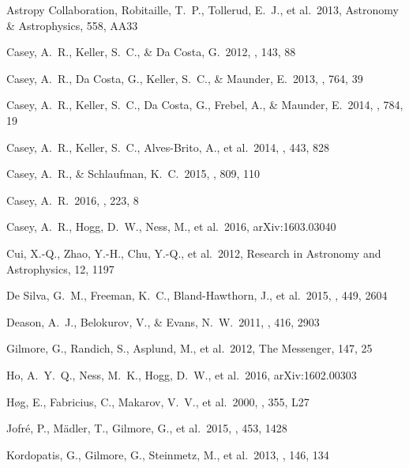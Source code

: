 \documentclass[preprint,trackchanges]{aastex}
\begin{document}
\begin{thebibliography}{dummy}
 Astropy Collaboration, Robitaille, T.~P., Tollerud, E.~J., et al.\ 2013, Astronomy \& Astrophysics, 558, AA33

 Casey, A.~R., Keller, S.~C., \& Da Costa, G.\ 2012, \aj, 143, 88 

 Casey, A.~R., Da Costa, G., Keller, S.~C., \& Maunder, E.\ 2013, \apj, 764, 39 

 Casey, A.~R., Keller, S.~C., Da Costa, G., Frebel, A., \& Maunder, E.\ 2014, \apj, 784, 19 

 Casey, A.~R., Keller, S.~C., Alves-Brito, A., et al.\ 2014, \mnras, 443, 828 

 Casey, A.~R., \& Schlaufman, K.~C.\ 2015, \apj, 809, 110 

 Casey, A.~R.\ 2016, \apjs, 223, 8 

 Casey, A.~R., Hogg, D.~W., Ness, M., et al.\ 2016, arXiv:1603.03040 

 Cui, X.-Q., Zhao, Y.-H., Chu, Y.-Q., et al.\ 2012, Research in Astronomy and Astrophysics, 12, 1197 

 De Silva, G.~M., Freeman, K.~C., Bland-Hawthorn, J., et al.\ 2015, \mnras, 449, 2604 

 Deason, A.~J., Belokurov, V., \& Evans, N.~W.\ 2011, \mnras, 416, 2903 

 Gilmore, G., Randich, S., Asplund, M., et al.\ 2012, The Messenger, 147, 25

 Ho, A.~Y.~Q., Ness, M.~K., Hogg, D.~W., et al.\ 2016, arXiv:1602.00303 
 
 H{\o}g, E., Fabricius, C., Makarov, V.~V., et al.\ 2000, \aap, 355, L27 

 Jofr{\'e}, P., M{\"a}dler, T., Gilmore, G., et al.\ 2015, \mnras, 453, 1428 

 Kordopatis, G., Gilmore, G., Steinmetz, M., et al.\ 2013, \aj, 146, 134 


\end{thebibliography}
\end{document}
